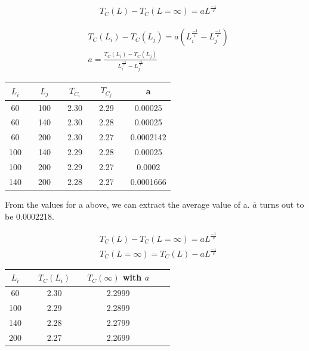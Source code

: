 \begin{align*}
    &T_C (L) - T_C (L=\infty) = a L^{\frac{-1}{v}}
\end{align*}

\begin{align*}
    &T_C (L_i) - T_C (L_j) = a 
    \left(
    L_i^{\frac{-1}{v}}-L_j^{\frac{-1}{v}}
    \right)
    \\
    &a = 
    \frac{T_C (L_i) - T_C (L_j)} 
    {
    L_i^{\frac{-1}{v}}-L_j^{\frac{-1}{v}}
    }
\end{align*}


\begin{center}
\label{tab:extracting a}
\begin{tabularx}{\textwidth}{c X c X c X c X c}
    \hline 
    \hline 
        $L_i$ && $L_j$ && $T_{C_i}$ && $T_{C_j}$ && a\\ 
    \hline
        60      &&      100     &&  2.30  &&  2.29  && 0.00025 \\
        60      &&      140     &&  2.30  &&  2.28  && 0.00025 \\
        60      &&      200     &&  2.30  &&  2.27  && 0.0002142 \\
        100     &&      140     &&  2.29  &&  2.28  && 0.00025 \\
        100     &&      200     &&  2.29  &&  2.27  && 0.0002 \\
        140     &&      200     &&  2.28  &&  2.27  && 0.0001666 \\
    \hline
\end{tabularx}
\end{center}

From the values for a above, we can extract the average value of a.
 $\overline{a}$ turns out to be 0.0002218.

\begin{align*}
    &T_C (L) - T_C (L=\infty) = a L^{\frac{-1}{v}}
    \\
    &T_C (L=\infty) =T_C (L) -  a L^{\frac{-1}{v}}
\end{align*}

\begin{center}
\label{tab:extracting a}
\begin{tabularx}{\textwidth}{c X c X c X c }
    \hline 
    \hline 
        $L_i$ && $T_C(L_i)$ && $T_C(\infty)$ with $\overline{a}$ \\ 
    \hline
        60      &&  2.30  && 2.2999\\
        100     &&  2.29  && 2.2899\\
        140     &&  2.28  && 2.2799\\
        200     &&  2.27  && 2.2699\\
    \hline
\end{tabularx}
\end{center}
